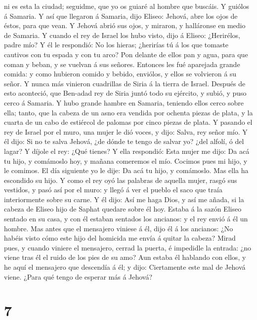 ni es esta la ciudad; seguidme, que yo os guiaré al hombre que buscáis.
Y guiólos á Samaria.  Y así que llegaron á Samaria, dijo
Eliseo: Jehová, abre los ojos de éstos, para que vean. Y Jehová abrió
sus ojos, y miraron, y halláronse en medio de Samaria.  Y
cuando el rey de Israel los hubo visto, dijo á Eliseo: ¿Herirélos, padre
mío?  Y él le respondió: No los hieras; ¿herirías tú á
los que tomaste cautivos con tu espada y con tu arco? Pon delante de
ellos pan y agua, para que coman y beban, y se vuelvan á sus señores.
 Entonces les fué aparejada grande comida: y como
hubieron comido y bebido, enviólos, y ellos se volvieron á su señor. Y
nunca más vinieron cuadrillas de Siria á la tierra de Israel.
 Después de esto aconteció, que Ben-adad rey de Siria
juntó todo su ejército, y subió, y puso cerco á Samaria. 
Y hubo grande hambre en Samaria, teniendo ellos cerco sobre ella; tanto,
que la cabeza de un asno era vendida por ochenta piezas de plata, y la
cuarta de un cabo de estiércol de palomas por cinco piezas de plata.
 Y pasando el rey de Israel por el muro, una mujer le dió
voces, y dijo: Salva, rey señor mío.  Y él dijo: Si no te
salva Jehová, ¿de dónde te tengo de salvar yo? ¿del alfolí, ó del lagar?
 Y díjole el rey: ¿Qué tienes? Y ella respondió: Esta
mujer me dijo: Da acá tu hijo, y comámoslo hoy, y mañana comeremos el
mío.  Cocimos pues mi hijo, y le comimos. El día
siguiente yo le dije: Da acá tu hijo, y comámoslo. Mas ella ha escondido
su hijo.  Y como el rey oyó las palabras de aquella
mujer, rasgó sus vestidos, y pasó así por el muro: y llegó á ver el
pueblo el saco que traía interiormente sobre su carne.  Y
él dijo: Así me haga Dios, y así me añada, si la cabeza de Eliseo hijo
de Saphat quedare sobre él hoy.  Estaba á la sazón Eliseo
sentado en su casa, y con él estaban sentados los ancianos: y el rey
envió á él un hombre. Mas antes que el mensajero viniese á él, dijo él á
los ancianos: ¿No habéis visto cómo este hijo del homicida me envía á
quitar la cabeza? Mirad pues, y cuando viniere el mensajero, cerrad la
puerta, é impedidle la entrada: ¿no viene tras él el ruido de los pies
de su amo?  Aun estaba él hablando con ellos, y he aquí
el mensajero que descendía á él; y dijo: Ciertamente este mal de Jehová
viene. ¿Para qué tengo de esperar más á Jehová?

\hypertarget{section-6}{%
\section{7}\label{section-6}}

